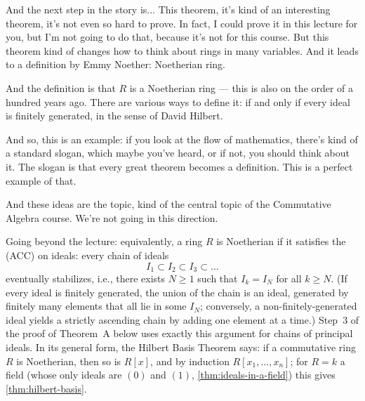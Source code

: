 \begin{speech}[00:03:30 - 00:04:50]
And the next step in the story is... This theorem, it's kind of an interesting theorem, it's not even so hard to prove. In fact, I could prove it in this lecture for you, but I'm not going to do that, because it's not for this course. But this theorem kind of changes how to think about rings in many variables. And it leads to a definition by Emmy Noether:  Noetherian ring.

And the definition  is that $R$ is a Noetherian ring --- this is also on the order of a hundred years ago. There are various ways to define it: if and only if every ideal  is finitely generated, in the sense of David Hilbert.

And so, this is an example: if you look at the flow of mathematics, there's kind of a standard slogan, which maybe you've heard, or if not, you should think about it. The slogan is that every great theorem becomes a definition. This is a perfect example of that.

And these ideas are the topic, kind of the central topic of the Commutative Algebra course. We're not going in this direction.
\end{speech}

\begin{content}

\begin{steps}
Going beyond the lecture: equivalently, a ring $R$ is Noetherian if it satisfies the  (ACC) on ideals: every chain of ideals
\[
I_1 \subset I_2 \subset I_3 \subset \dots
\]
eventually stabilizes, i.e., there exists $N \ge 1$ such that $I_k = I_N$ for all $k \ge N$. (If every ideal is finitely generated, the union of the chain is an ideal, generated by finitely many elements that all lie in some $I_N$; conversely, a non-finitely-generated ideal yields a strictly ascending chain by adding one element at a time.) Step~3 of the proof of Theorem~A below uses exactly this argument for chains of principal ideals. In its general form, the Hilbert Basis Theorem says: if a commutative ring $R$ is Noetherian, then so is $R[x]$, and by induction $R[x_1, \dots, x_n]$; for $R = k$ a field (whose only ideals are $(0)$ and $(1)$, \cref{thm:ideals-in-a-field}) this gives \cref{thm:hilbert-basis}.
\end{steps}
\end{content}

